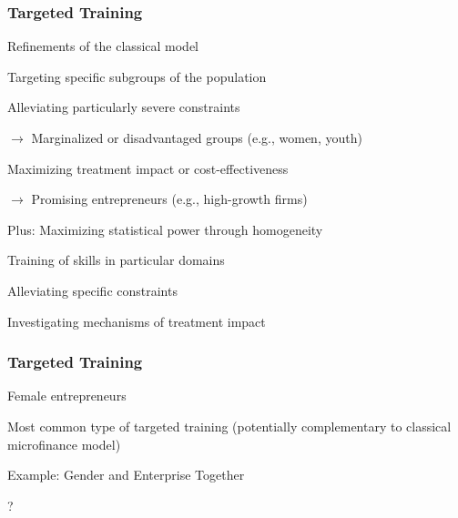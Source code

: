 \documentclass[hideothersubsections, usenames,dvipsnames,11pt]{beamer}
\newenvironment{itemize_2pt}{\itemize\addtolength{\itemsep}{2pt}}{\enditemize}
\begin{document}
\begin{frame}
\frametitle{Targeted Training}
	Refinements of the classical model
	
	\vspace{0.5em}
	
	\begin{itemize_2pt}
		\item Targeting \textcolor{bdf}{specific subgroups} of the population
		\begin{itemize_2pt}
			\item Alleviating \textcolor{bdf}{particularly severe constraints}
			\item[] $\rightarrow$ Marginalized or disadvantaged groups (e.g., women, youth)
			\item  Maximizing \textcolor{bdf}{treatment impact} or cost-effectiveness 
			\item[] $\rightarrow$ Promising entrepreneurs (e.g., high-growth firms)
			
			\vspace{0.5em}			
			
			\item Plus: \textcolor{bdf}{Maximizing statistical power} through homogeneity
		\end{itemize_2pt}
		
	\vspace{1.0em}		
		
		\item Training of skills in \textcolor{bdf}{particular domains}
		\begin{itemize_2pt}
			\item Alleviating \textcolor{bdf}{specific constraints}
			\item Investigating mechanisms of treatment impact
		\end{itemize_2pt}
	\end{itemize_2pt}
\end{frame}

\begin{frame}
\frametitle{Targeted Training}
	Female entrepreneurs
	\begin{itemize_2pt}
		\item \textcolor{bdf}{Most common type of targeted training} (potentially complementary to classical microfinance model)
		\item Example: Gender and Enterprise Together \citep[GET Ahead, ILO;][]{Bulte2016,McKenziePuerto2020}
		\item ?
	\vspace{0.1in}
	\end{itemize_2pt}
\end{frame}
\end{document}
